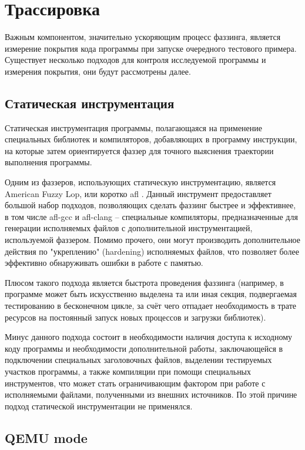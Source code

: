 \section{Трассировка}\label{sec:trace}

Важным компонентом, значительно ускоряющим процесс фаззинга, является измерение покрытия кода программы при запуске очередного тестового примера. Существует несколько подходов для контроля исследуемой программы и измерения покрытия, они будут рассмотрены далее.


\subsection{Статическая инструментация}

Статическая инструментация программы, полагающаяся на применение специальных библиотек и компиляторов, добавляющих в программу инструкции, на которые затем ориентируется фаззер для точного выяснения траектории выполнения программы.

Одним из фаззеров, использующих статическую инструментацию, является American Fuzzy Lop, или коротко afl \cite{afl}. Данный инструмент предоставляет большой набор подходов, позволяющих сделать фаззинг быстрее и эффективнее, в том числе afl-gcc и afl-clang -- специальные компиляторы, предназначенные для генерации исполняемых файлов с дополнительной инструментацией, используемой фаззером. Помимо прочего, они могут производить дополнительное действия по "укреплению" (hardening) исполняемых файлов, что позволяет более эффективно обнаруживать ошибки в работе с памятью.

Плюсом такого подхода является быстрота проведения фаззинга (например, в программе может быть искусственно выделена та или иная секция, подвергаемая тестированию в бесконечном цикле, за счёт чего отпадает необходимость в трате ресурсов на постоянный запуск новых процессов и загрузки библиотек).

Минус данного подхода состоит в необходимости наличия доступа к исходному коду программы и необходимости дополнительной работы, заключающейся в подключении специальных заголовочных файлов, выделении тестируемых участков программы, а также компиляции при помощи специальных инструментов, что может стать ограничивающим фактором при работе с исполняемыми файлами, полученными из внешних источников. По этой причине подход статической инструментации не применялся.

\subsection{QEMU mode}

